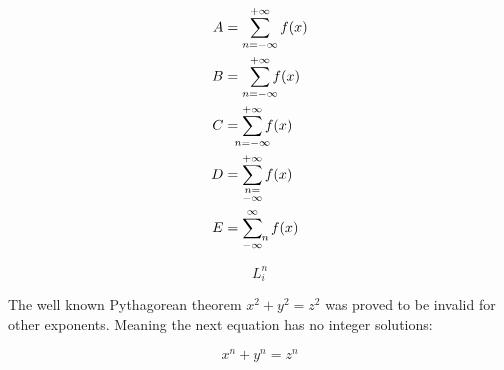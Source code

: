 \documentclass{article}
\begin{document}
\begin{align*}
  A &= \sum_{n=-\infty}^{+\infty} f(x) \\
  B &= \smashoperator[r]{\sum_{n=-\infty}^{+\infty}} f(x) \\
  C &= \sum_{\mathclap{n=-\infty}}^{+\infty} f(x) \\
  D &= \sum_{\substack{n={}\\-\infty}}^{+\infty} f(x) \\
  E &= \sum_{-\infty}^{\infty}\mathop{}_{\mkern-5mu n} f(x)
\end{align*}

\[ L_{i}^{n}\]



 
The well known Pythagorean theorem \(x^2 + y^2 = z^2\) was 
proved to be invalid for other exponents. 
Meaning the next equation has no integer solutions:

\[ x^n + y^n = z^n \]
 
\end{document}
